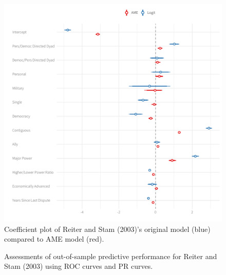 \documentclass[12pt]{amsart}
\begin{document}
\begin{figure}
\includegraphics[width=\textwidth]{reiter_coefs_all.pdf}
\caption{\label{fig:reitCoef} Coefficient plot of Reiter and Stam (2003)'s original model (blue) compared to AME model (red). }
\end{figure}

\begin{figure}
\centering   
{}
\caption{Assessments of out-of-sample predictive performance for Reiter and Stam (2003) using ROC curves and PR curves.}
\end{figure}
\end{document}
